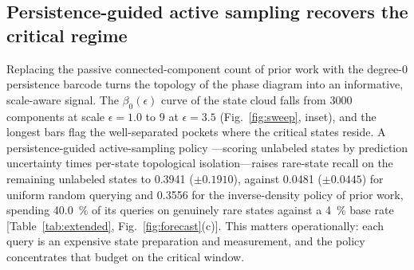 \documentclass[aps,prresearch,reprint,amsmath,amssymb,nofootinbib,superscriptaddress,floatfix]{revtex4-2}
\theoremstyle{definition}
\theoremstyle{remark}
\theoremstyle{plain}
\begin{document}
\subsection{Persistence-guided active sampling recovers the critical regime}
Replacing the passive connected-component count of prior work with the degree-$0$ persistence barcode turns
the topology of the phase diagram into an informative, scale-aware signal. The $\beta_0(\epsilon)$ curve of
the state cloud falls from \num{3000} components at scale $\epsilon=1.0$ to $9$ at $\epsilon=3.5$
(Fig.~\ref{fig:sweep}, inset), and the longest bars flag the well-separated pockets where the critical
states reside. A persistence-guided active-sampling policy \cite{settles2009active}---scoring unlabeled states by prediction
uncertainty times per-state topological isolation---raises rare-state recall on the remaining unlabeled
states to \num{0.3941} ($\pm\num{0.1910}$), against \num{0.0481} ($\pm\num{0.0445}$) for uniform random
querying and \num{0.3556} for the inverse-density policy of prior work, spending \SI{40.0}{\percent} of its
queries on genuinely rare states against a \SI{4}{\percent} base rate [Table~\ref{tab:extended},
Fig.~\ref{fig:forecast}(c)]. This matters operationally: each query is an expensive state preparation and
measurement, and the policy concentrates that budget on the critical window.

\begin{table}[t]
\centering
\caption{\textbf{Extended data: operator, conformal, active-sampling, and persistence diagnostics.}
Generated verbatim by \texttt{scripts/make\_tables.py} from the \texttt{operator}, \texttt{conformal},
\texttt{active\_sampling}, and \texttt{persistence} blocks of \texttt{results/summary.json}; mean $\pm$
\SI{95}{\percent} CI over $n=\num{5}$ seeds where reported. $\nu(\cdot)$ is the relative non-normality;
$M_\phi,M_\psi$ are truncated multiplication operators for the first two shadow-feature coordinates.}
\label{tab:extended}
\setlength{\tabcolsep}{4pt}
\footnotesize

\end{table}
\end{document}
